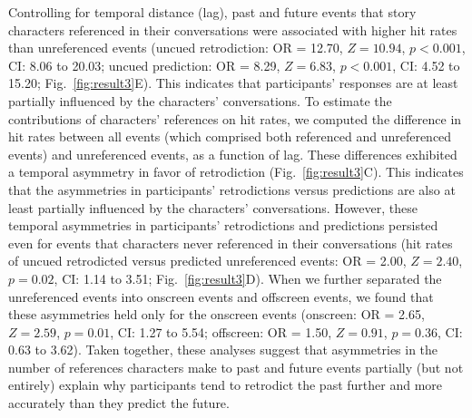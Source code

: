 \documentclass[10pt]{article}
\begin{document}
Controlling for temporal distance (lag), past and future events that story characters referenced in their conversations were associated with higher hit rates than unreferenced events (uncued retrodiction: OR = 12.70, $Z = 10.94$, $p < 0.001$, CI: 8.06 to 20.03; uncued prediction: OR = 8.29, $Z = 6.83$, $p < 0.001$, CI: 4.52 to 15.20; Fig.~\ref{fig:result3}E).  This indicates that participants' responses are at least partially influenced by the characters' conversations.  
To estimate the contributions of characters’ references on hit rates, we computed the difference in hit rates between all events (which comprised both referenced and unreferenced events) and unreferenced events, as a function of lag. 
These differences exhibited a temporal asymmetry in favor of retrodiction (Fig.~\ref{fig:result3}C).  
This indicates that the asymmetries in participants' retrodictions versus predictions are also at least partially influenced by the characters' conversations. 
However, these temporal asymmetries in participants' retrodictions and predictions persisted even for events that characters never referenced in their conversations (hit rates of uncued retrodicted versus predicted unreferenced events: OR = 2.00, $Z = 2.40$, $p = 0.02$, CI: 1.14 to 3.51; Fig.~\ref{fig:result3}D).  When we further separated the unreferenced events into onscreen events and offscreen events, we found that these asymmetries held only for the onscreen events (onscreen: OR = 2.65, $Z = 2.59$, $p = 0.01$, CI: 1.27 to 5.54; offscreen: OR = 1.50, $Z = 0.91$, $p = 0.36$, CI: 0.63 to 3.62).  Taken together, these analyses suggest that asymmetries in the number of references characters make to past and future events partially (but not entirely) explain why participants tend to retrodict the past further and more accurately than they predict the future.
\end{document}
